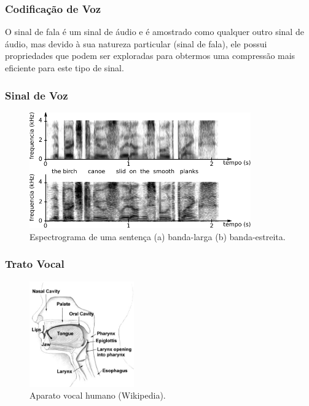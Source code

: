\begin{frame}
  \frametitle{Codificação de Voz}
  O sinal de fala é um sinal de áudio e é amostrado como qualquer outro sinal de áudio, mas
  devido à sua natureza particular (sinal de fala), ele possui propriedades que podem ser
  exploradas para obtermos uma compressão mais eficiente para este tipo de sinal.
\end{frame}


\begin{frame}
  \frametitle{Sinal de Voz}
  \begin{figure}[h]
  \centering
  \includegraphics[width=0.85\textwidth]{images/spectrogram_birch_canoe.pdf}
  \caption{Espectrograma de uma sentença (a) banda-larga (b) banda-estreita.}
  \label{fig:specgram}
  \end{figure}
\end{frame}


\begin{frame}
  \frametitle{Trato Vocal}
  \begin{figure}[h]
  \centering 
  \includegraphics[width=0.4\textwidth]{images/head_neck.jpg}
  \caption{Aparato vocal humano (Wikipedia).}
  \label{fig:speech_apparatus}
  \end{figure}
\end{frame}


